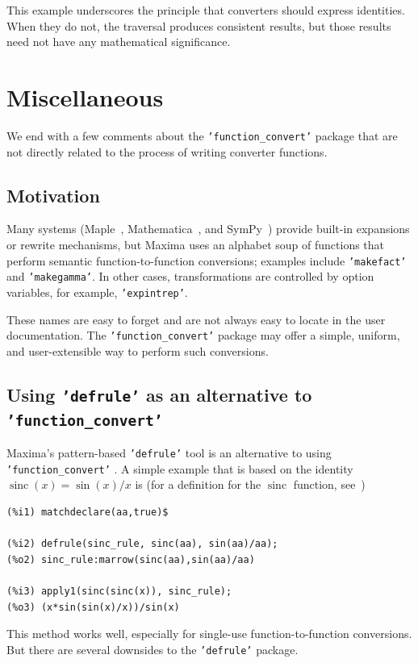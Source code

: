 \documentclass[12pt,fleqn]{extarticle}
\newcommand{\ttq}[1]{\texttt{'#1'}}
\newcommand{\funconvert}{\ttq{function\_convert}{ }}
\newenvironment{maximabox}
  {\begin{tcolorbox}[
      breakable,
      enhanced,
      colback=white,
      colframe=black!8,
      boxrule=0pt,
      borderline west={2.2pt}{0pt}{black!25},
      arc=1pt,
      left=11pt,
      right=7pt,
      top=9pt,
      bottom=9pt,
      before skip=14pt,
      after skip=14pt
    ]}
  {\end{tcolorbox}}
\DeclareMathOperator{\sinc}{sinc}
\begin{document}
This example underscores the principle that converters should express
identities.  When they do not, the traversal produces consistent results, but 
those results need not have any mathematical significance.

\section{Miscellaneous}

We end with a few comments about the \funconvert package that are not directly related to the process of writing converter functions.

\subsection {Motivation} 

Many systems (Maple~\cite{maple-convert}, Mathematica~\cite{mathematica-rules}, and SymPy~\cite{sympy-rewrite}) provide built-in expansions or rewrite mechanisms, but Maxima uses an alphabet soup of 
functions that perform semantic function-to-function conversions; examples include  \ttq{makefact}
and \ttq{makegamma}. In other cases, transformations are controlled by option variables, for example, 
\ttq{expintrep}. 

These names are easy to forget and are not always easy to locate in the user documentation. 
The \funconvert package may offer a simple, uniform, and user-extensible way to perform such conversions.

\subsection{Using  \ttq{defrule} as an alternative to \funconvert}

Maxima's pattern-based \ttq{defrule} tool is an alternative to using \funconvert. A simple
example that is based on the identity \(\sinc(x) = \sin(x)/x\) is (for a definition for the $\sinc$ function,
see~\cite{mathworld-sinc})
\begin{maximabox}
\begin{verbatim}
(%i1) matchdeclare(aa,true)$

(%i2) defrule(sinc_rule, sinc(aa), sin(aa)/aa);
(%o2) sinc_rule:marrow(sinc(aa),sin(aa)/aa)

(%i3) apply1(sinc(sinc(x)), sinc_rule);
(%o3) (x*sin(sin(x)/x))/sin(x)
\end{verbatim}
\end{maximabox}
This method works well, especially for single-use function-to-function conversions. But there are several downsides to the \ttq{defrule} package.
\end{document}
